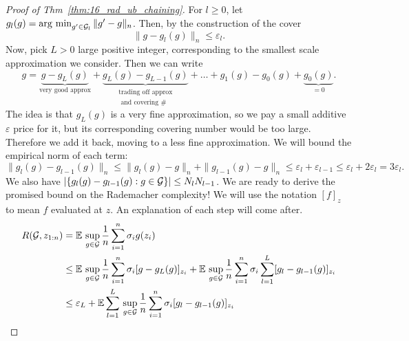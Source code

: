\documentclass[twoside]{article}
\newcommand{\zn}{z_{1:n}}
\newcommand{\supg}{\sup_{g \in \cG}}
\begin{document}
\begin{proof}[Proof of Thm~\ref{thm:16_rad_ub_chaining}]
    For $l \geq 0$, let $g_l(g) = \operatorname*{arg\ min}_{g' \in \mathcal{G}_l} \| g' - g \|_n$. Then, by the construction of the cover
    \begin{equation*}
        \| g - g_l(g) \|_n \leq \varepsilon_l.
    \end{equation*}
    Now, pick $L > 0$ large positive integer, corresponding to the smallest scale approximation we consider. Then we can write
    \begin{equation} \label{eq:16_gsplit}
        g = \underbrace{g - g_L(g)}_{\textrm{very good approx}} + \underbrace{g_L(g) - g_{L-1}(g)}_{\substack{\text{trading off approx} \\ \text{ and covering \#}}} + \dotsc + g_1(g) - g_0(g) + \underbrace{g_0(g)}_{=0}.
    \end{equation}
    The idea is that $g_L(g)$ is a very fine approximation, so we pay a small additive $\varepsilon$ price for it, but its corresponding covering number would be too large. Therefore we add it back, moving to a less fine approximation.
    We will bound the empirical norm of each term:
    \begin{equation*}
        \| g_l(g) - g_{l-1}(g) \|_n \leq 
            \| g_l(g) - g \|_n + \| g_{l-1}(g) - g \|_n
            \leq \varepsilon_l + \varepsilon_{l-1}
            \leq \varepsilon_l + 2\varepsilon_l
            = 3\varepsilon_l.
    \end{equation*}
    We also have $| \{ g_l(g) - g_{l-1}(g) : g \in \mathcal{G} \}| \leq N_l N_{l-1}$. We are ready to derive the promised bound on the Rademacher complexity! We will use the notation $[f]_z$ to mean $f$ evaluated at $z$. An explanation of each step will come after.
    \begin{align}
        R(\cG, \zn) & = \E \, \supg \frac1n \sum_{i=1}^n \sigma_i g(z_i) \nonumber  \\
            & \leq \E  \, \supg \frac1n \sum_{i=1}^n \sigma_i [g - g_L(g)]_{z_i}
                + \E  \, \supg \frac1n \sum_{i=1}^n \sigma_i \sum_{l=1}^L [g_l - g_{l-1}(g)]_{z_i}  \label{eq:16_st1}  \\
            & \leq \varepsilon_L
                + \E  \sum_{l=1}^L  \, \supg \frac1n \sum_{i=1}^n  \sigma_i [g_l - g_{l-1}(g)]_{z_i}   \label{eq:16_st2}  \\

\end{align}
\end{proof}
\end{document}
